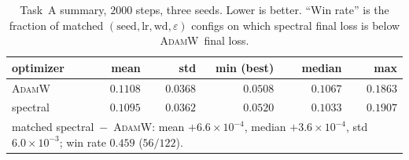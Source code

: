\documentclass{article}
\newcommand{\Adamw}{\textsc{AdamW}}
\begin{document}
\begin{table}[h]
\centering
\caption{Task~A summary, $2000$ steps, three seeds.  Lower is
better.  ``Win rate'' is the fraction of matched
$(\text{seed},\text{lr},\text{wd},\varepsilon)$ configs on which
spectral final loss is below \Adamw\ final loss.}
\label{tab:task_a}
\begin{tabular}{l r r r r r}
\toprule
optimizer & mean & std & min (best) & median & max\\
\midrule
\Adamw\     & $0.1108$ & $0.0368$ & $\mathbf{0.0508}$ & $0.1067$ & $0.1863$\\
spectral    & $\mathbf{0.1095}$ & $0.0362$ & $0.0520$ & $0.1033$ & $0.1907$\\
\midrule
\multicolumn{6}{l}{matched spectral~$-$~\Adamw: mean $+6.6\!\times\!10^{-4}$,
median $+3.6\!\times\!10^{-4}$, std $6.0\!\times\!10^{-3}$;
win rate $0.459$ ($56/122$).}\\
\bottomrule
\end{tabular}
\end{table}
\end{document}
